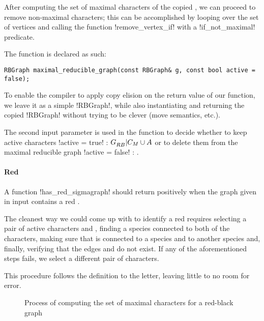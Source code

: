 After computing the set of maximal characters \cm{} of the copied \grb{}, we can proceed to remove non-maximal characters; this can be accomplished by looping over the set of vertices and calling the function !remove_vertex_if! with a !if_not_maximal! predicate.

The function is declared as such:

\begin{lstlisting}[moreemph={RBGraph},
                   moreemph={[2]maximal_reducible_graph}]
  RBGraph maximal_reducible_graph(const RBGraph& g, const bool active = false);
\end{lstlisting}

To enable the compiler to apply copy elision on the return value of our function, we leave it as a simple !RBGraph!, while also instantiating and returning the copied !RBGraph! without trying to be clever (move semantics, etc.).

The second input parameter is used in the function to decide whether to keep active characters \textendash{} !active = true! : $G_{RB}^{}{}|C_{M}{}{} \cup A$ \textendash{} or to delete them from the maximal reducible graph \textendash{} !active = false! : \grbcm{}.

\paragraph{Red \boldmath{\sg{}}}

A function !has_red_sigmagraph! should return positively when the graph \grb{} given in input contains a red \sg{}.

The cleanest way we could come up with to identify a red \sg{} requires selecting a pair of active characters \character[0] and \character[1], finding a species \species[1] connected to both of the characters, making sure that \character[0] is connected to a species \species[0] and \character[1] to another species \species[2] and, finally, verifying that the edges \edge{\character[0]}{\species[2]} and \edge{\character[1]}{\species[0]} do not exist.
If any of the aforementioned steps fails, we select a different pair of characters.

This procedure follows the definition to the letter, leaving little to no room for error.

\begin{figure}[hp]
  

  \caption{Process of computing the set of maximal characters \cm{} for a red-black graph \grb{}}\label{figure:5}
\end{figure}


